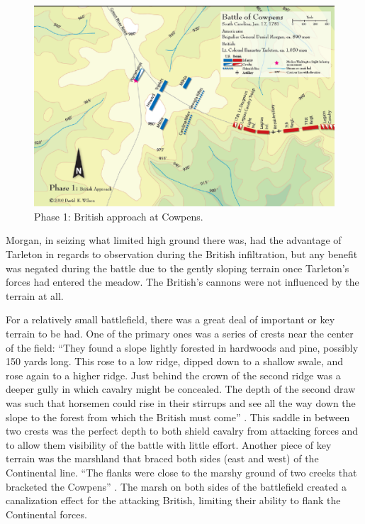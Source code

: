 \begin{figure}[h]
    \begin{center}
    \includegraphics[width=\textwidth]{gfx/futch1}
    \end{center}
    \caption{Phase 1: British approach at Cowpens. \cite{wilson_blogmap}}
    \label{terrain1a}
\end{figure}

Morgan, in seizing what limited high ground there was, had the advantage of
Tarleton in regards to observation during the British infiltration, but any
benefit was negated during the battle due to the gently sloping terrain once
Tarleton’s forces had entered the meadow.  The British’s cannons were not
influenced by the terrain at all. 

For a relatively small battlefield, there was a great deal of important or key
terrain to be had.  One of the primary ones was a series of crests near the
center of the field: “They found a slope lightly forested in hardwoods and pine,
possibly 150 yards long. This rose to a low ridge, dipped down to a shallow
swale, and rose again to a higher ridge.  Just behind the crown of the second
ridge was a deeper gully in which cavalry might be concealed.  The depth of the
second draw was such that horsemen could rise in their stirrups and see all the
way down the slope to the forest from which the British must come”
\cite[126]{lumpkin_savannah_1981} \cite[126]{lumpkin_savannah_1981}.
This saddle in between two crests was the perfect depth to both shield
cavalry from attacking forces and to allow them visibility of the battle with
little effort. Another piece of key terrain was the marshland that braced both
sides (east and west) of the Continental line.  ``The flanks were close to the
marshy ground of two creeks that bracketed the Cowpens'' \cite[327]{stephenson_patriot_2007}.
The marsh on both sides of the battlefield created a canalization effect for the
attacking British, limiting their ability to flank the Continental forces.  

